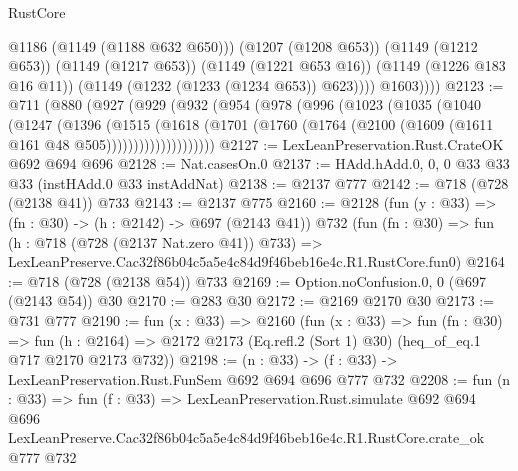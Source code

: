 \begin{lexlean}{RustCore}
\begin{coremodule}
                  @1186
                  (@1149 (@1188 @632 @650)))
                (@1207 (@1208 @653))
                (@1149 (@1212 @653))
                (@1149 (@1217 @653))
                (@1149 (@1221 @653 @16))
                (@1149 (@1226 @183 @16 @11))
                (@1149 (@1232 (@1233 (@1234 @653)) @623))))
            @1603))))
@2123 := @711
    (@880
      (@927
        (@929
          (@932
            (@954
              (@978
                (@996
                  (@1023
                    (@1035
                      (@1040
                        (@1247
                          (@1396
                            (@1515
                              (@1618
                                (@1701
                                  (@1760
                                    (@1764 (@2100 (@1609 (@1611 @161 @48 @505))))))))))))))))))))
@2127 := LexLeanPreservation.Rust.CrateOK @692 @694 @696
@2128 := Nat.casesOn.{0}
@2137 := HAdd.hAdd.{0, 0, 0} @33 @33 @33 (instHAdd.{0} @33 instAddNat)
@2138 := @2137 @777
@2142 := @718 (@728 (@2138 @41)) @733
@2143 := @2137 @775
@2160 := @2128
    (fun (y : @33) => (fn : @30) -> (h : @2142) -> @697 (@2143 @41))
    @732
    (fun (fn : @30) =>
    fun (h : @718 (@728 (@2137 Nat.zero @41)) @733) =>
    LexLeanPreserve.Cac32f86b04c5a5e4c84d9f46beb16e4c.R1.RustCore.fun0)
@2164 := @718 (@728 (@2138 @54)) @733
@2169 := Option.noConfusion.{0, 0} (@697 (@2143 @54)) @30
@2170 := @283 @30
@2172 := @2169 @2170 @30
@2173 := @731 @777
@2190 := fun (x : @33) =>
  @2160
    (fun (x : @33) =>
    fun (fn : @30) =>
    fun (h : @2164) => @2172 @2173 (Eq.refl.{2} (Sort 1) @30) (heq_of_eq.{1} @717 @2170 @2173 @732))
@2198 := (n : @33) -> (f : @33) -> LexLeanPreservation.Rust.FunSem @692 @694 @696 @777 @732
@2208 := fun (n : @33) =>
  fun (f : @33) =>
  LexLeanPreservation.Rust.simulate
    @692
    @694
    @696
    LexLeanPreserve.Cac32f86b04c5a5e4c84d9f46beb16e4c.R1.RustCore.crate_ok
    @777
    @732
\end{coremodule}
\end{lexlean}
